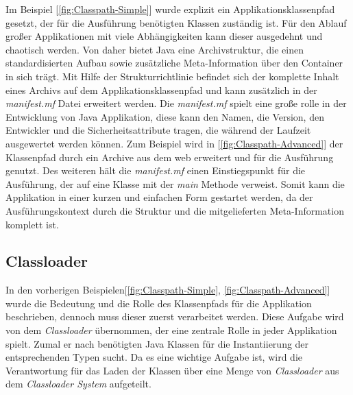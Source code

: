 Im Beispiel [\ref{fig:Classpath-Simple}] wurde explizit ein Applikationsklassenpfad gesetzt, der für die Ausführung benötigten Klassen zuständig ist. Für den Ablauf großer Applikationen mit viele Abhängigkeiten kann dieser ausgedehnt und chaotisch werden. Von daher bietet Java eine Archivstruktur, die einen standardisierten Aufbau sowie zusätzliche Meta-Information über den Container in sich trägt. Mit Hilfe der Strukturrichtlinie befindet sich der komplette Inhalt eines Archivs auf dem Applikationsklassenpfad und kann zusätzlich in der \textit{manifest.mf} Datei erweitert werden. Die \textit{manifest.mf} spielt eine große rolle in der Entwicklung von Java Applikation, diese kann den Namen, die Version, den Entwickler und die Sicherheitsattribute tragen, die während der Laufzeit ausgewertet werden können. Zum Beispiel wird in [\ref{fig:Classpath-Advanced}] der Klassenpfad durch ein Archive aus dem web erweitert und für die Ausführung genutzt. Des weiteren hält die \textit{manifest.mf} einen Einstiegspunkt für die Ausführung, der auf eine Klasse mit der \textit{main} Methode verweist. Somit kann die Applikation in einer kurzen und einfachen Form gestartet werden, da der Ausführungskontext durch die Struktur und die mitgelieferten Meta-Information komplett ist.

\subsection{Classloader}
\label{ssub:classloader}
In den vorherigen Beispielen[\ref{fig:Classpath-Simple}, \ref{fig:Classpath-Advanced}] wurde die Bedeutung und die Rolle des Klassenpfads für die Applikation beschrieben, dennoch muss dieser zuerst verarbeitet werden. Diese Aufgabe wird von dem \textit{Classloader} übernommen, der eine zentrale Rolle in jeder Applikation spielt. Zumal er nach benötigten Java Klassen für die Instantiierung der entsprechenden Typen sucht. Da es eine wichtige Aufgabe ist, wird die Verantwortung für das Laden der Klassen über eine Menge von \textit{Classloader} aus dem \textit{Classloader System} aufgeteilt. 

